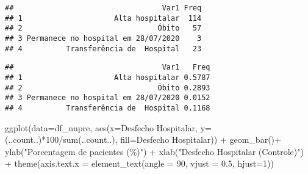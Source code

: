 \documentclass[
]{article}
\newenvironment{Shaded}{\begin{snugshade}}{\end{snugshade}}
\newcommand{\AttributeTok}[1]{\textcolor[rgb]{0.77,0.63,0.00}{#1}}
\newcommand{\DecValTok}[1]{\textcolor[rgb]{0.00,0.00,0.81}{#1}}
\newcommand{\FloatTok}[1]{\textcolor[rgb]{0.00,0.00,0.81}{#1}}
\newcommand{\FunctionTok}[1]{\textcolor[rgb]{0.00,0.00,0.00}{#1}}
\newcommand{\NormalTok}[1]{#1}
\newcommand{\SpecialCharTok}[1]{\textcolor[rgb]{0.00,0.00,0.00}{#1}}
\newcommand{\StringTok}[1]{\textcolor[rgb]{0.31,0.60,0.02}{#1}}
\begin{document}
\begin{Shaded}
\end{Shaded}

\begin{verbatim}
##                                  Var1 Freq
## 1                     Alta hospitalar  114
## 2                               Óbito   57
## 3 Permanece no hospital em 28/07/2020    3
## 4          Transferência de  Hospital   23
\end{verbatim}

\begin{Shaded}
\end{Shaded}

\begin{verbatim}
##                                  Var1   Freq
## 1                     Alta hospitalar 0.5787
## 2                               Óbito 0.2893
## 3 Permanece no hospital em 28/07/2020 0.0152
## 4          Transferência de  Hospital 0.1168
\end{verbatim}

\begin{Shaded}
\begin{Highlighting}[]
\FunctionTok{ggplot}\NormalTok{(}\AttributeTok{data=}\NormalTok{df\_nnpre, }\FunctionTok{aes}\NormalTok{(}\AttributeTok{x=}\StringTok{\textasciigrave{}}\AttributeTok{Desfecho Hospitalar}\StringTok{\textasciigrave{}}\NormalTok{, }\AttributeTok{y=}\NormalTok{(..count..)}\SpecialCharTok{*}\DecValTok{100}\SpecialCharTok{/}\FunctionTok{sum}\NormalTok{(..count..), }\AttributeTok{fill=}\StringTok{\textasciigrave{}}\AttributeTok{Desfecho Hospitalar}\StringTok{\textasciigrave{}}\NormalTok{)) }\SpecialCharTok{+}
  \FunctionTok{geom\_bar}\NormalTok{()}\SpecialCharTok{+}
  \FunctionTok{ylab}\NormalTok{(}\StringTok{"Porcentagem de pacientes (\%)"}\NormalTok{) }\SpecialCharTok{+}
  \FunctionTok{xlab}\NormalTok{(}\StringTok{"Desfecho Hospitalar (Controle)"}\NormalTok{) }\SpecialCharTok{+}
  \FunctionTok{theme}\NormalTok{(}\AttributeTok{axis.text.x =} \FunctionTok{element\_text}\NormalTok{(}\AttributeTok{angle =} \DecValTok{90}\NormalTok{, }\AttributeTok{vjust =} \FloatTok{0.5}\NormalTok{, }\AttributeTok{hjust=}\DecValTok{1}\NormalTok{))}
\end{Highlighting}
\end{Shaded}
\end{document}
